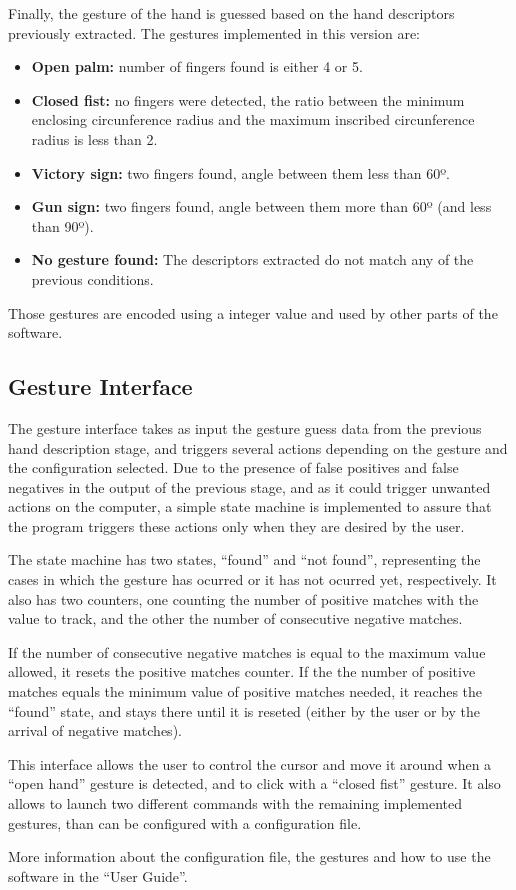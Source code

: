 Finally, the gesture of the hand is guessed based on the hand descriptors previously extracted. The gestures implemented in this version are:

\begin{itemize}
\item {\bfseries Open palm:} number of fingers found is either 4 or 5.
\item {\bfseries Closed fist:} no fingers were detected, the ratio between the minimum enclosing circunference radius and the maximum inscribed circunference radius is less than 2.
\item {\bfseries Victory sign:} two fingers found, angle between them less than 60º.
\item {\bfseries Gun sign:} two fingers found, angle between them more than 60º (and less than 90º).
\item {\bfseries No gesture found:} The descriptors extracted do not match any of the previous conditions.
\end{itemize}

Those gestures are encoded using a integer value and used by other parts of the software.


\subsection{Gesture Interface} 

The gesture interface takes as input the gesture guess data from the previous hand description stage, and triggers several actions depending on the gesture and the configuration selected. Due to the presence of false positives and false negatives in the output of the previous stage, and as it could trigger unwanted actions on the computer, a simple state machine is implemented to assure that the program triggers these actions only when they are desired by the user.

The state machine has two states, ``found'' and ``not found'', representing the cases in which the gesture has ocurred or it has not ocurred yet, respectively. It also has two counters, one counting the number of positive matches with the value to track, and the other the number of consecutive negative matches.

If the number of consecutive negative matches is equal to the maximum value allowed, it resets the positive matches counter. If the the number of positive matches equals the minimum value of positive matches needed, it reaches the ``found'' state, and stays there until it is reseted (either by the user or by the arrival of negative matches). 


This interface allows the user to control the cursor and move it around when a ``open hand'' gesture is detected, and to click with a ``closed fist'' gesture. It also allows to launch two different commands with the remaining implemented gestures, than can be configured with a configuration file.

More information about the configuration file, the gestures and how to use the software in the ``User Guide''. 

\newpage
